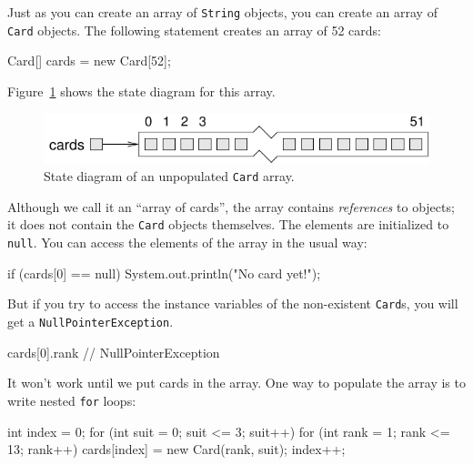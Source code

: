 \documentclass[12pt]{book}
\theoremstyle{exercise}
\newcommand{\java}[1]{\verb"#1"}
\begin{document}
Just as you can create an array of \java{String} objects, you can create an array of \java{Card} objects.
The following statement creates an array of 52 cards:

\begin{code}
    Card[] cards = new Card[52];
\end{code}


Figure~\ref{fig.cardarray} shows the state diagram for this array.

\begin{figure}
\begin{center}
\includegraphics{figs/cardarray.pdf}
\caption{State diagram of an unpopulated \java{Card} array.}
\label{fig.cardarray}
\end{center}
\end{figure}


Although we call it an ``array of cards'', the array contains {\em references} to objects; it does not contain the \java{Card} objects themselves.
The elements are initialized to \java{null}.
You can access the elements of the array in the usual way:

\begin{code}
    if (cards[0] == null) {
        System.out.println("No card yet!");
    }
\end{code}


But if you try to access the instance variables of the non-existent \java{Card}s, you will get a \java{NullPointerException}.

\begin{code}
    cards[0].rank      // NullPointerException
\end{code}


It won't work until we put cards in the array.
One way to populate the array is to write nested \java{for} loops:

\begin{code}
    int index = 0;
    for (int suit = 0; suit <= 3; suit++) {
        for (int rank = 1; rank <= 13; rank++) {
            cards[index] = new Card(rank, suit);
            index++;
        }
    }
\end{code}
\end{document}
